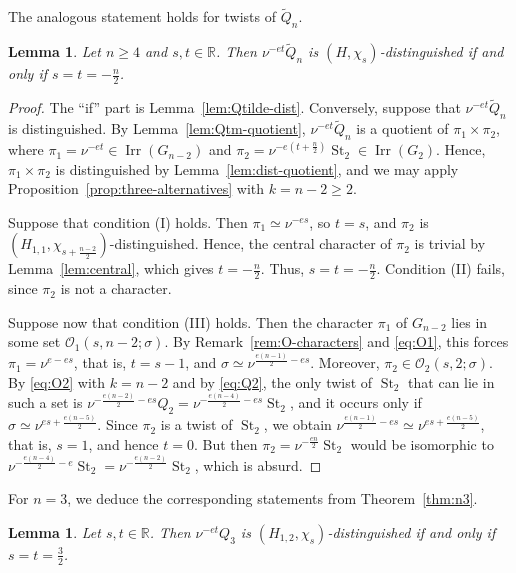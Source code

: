 \documentclass[11pt]{amsart}
\numberwithin{equation}{section}
\theoremstyle{plain}
\newtheorem{lemma}[theorem]{Lemma}
\theoremstyle{definition}
\theoremstyle{remark}
\newcommand{\R}{\mathbb{R}}
\DeclareMathOperator{\Irr}{Irr}
\DeclareMathOperator{\St}{St}
\newcommand{\Qt}{\widetilde{Q}}
\begin{document}
The analogous statement holds for twists of $\Qt_n$.

\begin{lemma}\label{lem:Qtn-twist-dist}
	Let $n\ge4$ and $s,t\in\R$. Then $\nu^{-et}\Qt_n$ is $(H,\chi_s)$-distinguished if and only if $s=t=-\frac n2$.
\end{lemma}

\begin{proof}
	The ``if'' part is Lemma~\ref{lem:Qtilde-dist}. Conversely, suppose that $\nu^{-et}\Qt_n$ is distinguished. By Lemma~\ref{lem:Qtm-quotient}, $\nu^{-et}\Qt_n$ is a quotient of $\pi_1\times\pi_2$, where $\pi_1=\nu^{-et}\in\Irr(G_{n-2})$ and $\pi_2=\nu^{-e(t+\frac n2)}\St_2\in\Irr(G_2)$. Hence, $\pi_1\times\pi_2$ is distinguished by Lemma~\ref{lem:dist-quotient}, and we may apply Proposition~\ref{prop:three-alternatives} with $k=n-2\ge2$.
	
	Suppose that condition (I) holds. Then $\pi_1\simeq\nu^{-es}$, so $t=s$, and $\pi_2$ is $(H_{1,1},\chi_{s+\frac{n-2}2})$-distinguished. Hence, the central character of $\pi_2$ is trivial by Lemma~\ref{lem:central}, which gives $t=-\frac n2$. Thus, $s=t=-\frac n2$. Condition (II) fails, since $\pi_2$ is not a character.
	
	Suppose now that condition (III) holds. Then the character $\pi_1$ of $G_{n-2}$ lies in some set $\mathcal O_1(s,n-2;\sigma)$. By Remark~\ref{rem:O-characters} and \eqref{eq:O1}, this forces $\pi_1=\nu^{e-es}$, that is, $t=s-1$, and $\sigma\simeq\nu^{\frac{e(n-1)}2-es}$. Moreover, $\pi_2\in\mathcal O_2(s,2;\sigma)$. By \eqref{eq:O2} with $k=n-2$ and by \eqref{eq:Q2}, the only twist of $\St_2$ that can lie in such a set is $\nu^{-\frac{e(n-2)}2-es}Q_2=\nu^{-\frac{e(n-4)}2-es}\St_2$, and it occurs only if $\sigma\simeq\nu^{es+\frac{e(n-5)}2}$. Since $\pi_2$ is a twist of $\St_2$, we obtain $\nu^{\frac{e(n-1)}2-es}\simeq\nu^{es+\frac{e(n-5)}2}$, that is, $s=1$, and hence $t=0$. But then $\pi_2=\nu^{-\frac{en}2}\St_2$ would be isomorphic to $\nu^{-\frac{e(n-4)}2-e}\St_2=\nu^{-\frac{e(n-2)}2}\St_2$, which is absurd.
\end{proof}

For $n=3$, we deduce the corresponding statements from Theorem~\ref{thm:n3}.

\begin{lemma}\label{lem:Q3-twist-dist}
	Let $s,t\in\R$. Then $\nu^{-et}Q_3$ is $(H_{1,2},\chi_s)$-distinguished if and only if $s=t=\frac32$.
\end{lemma}
\end{document}
